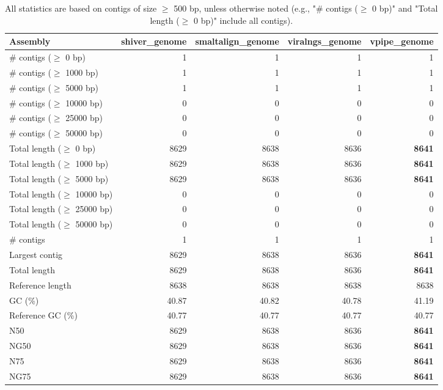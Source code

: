 \documentclass[12pt,a4paper]{article}
\begin{document}
\begin{table}[ht]
\begin{center}
\caption{All statistics are based on contigs of size $\geq$ 500 bp, unless otherwise noted (e.g., "\# contigs ($\geq$ 0 bp)" and "Total length ($\geq$ 0 bp)" include all contigs).}
\begin{tabular}{|l*{4}{|r}|}
\hline
Assembly & shiver\_genome & smaltalign\_genome & viralngs\_genome & vpipe\_genome \\ \hline
\# contigs ($\geq$ 0 bp) & 1 & 1 & 1 & 1 \\ \hline
\# contigs ($\geq$ 1000 bp) & 1 & 1 & 1 & 1 \\ \hline
\# contigs ($\geq$ 5000 bp) & 1 & 1 & 1 & 1 \\ \hline
\# contigs ($\geq$ 10000 bp) & 0 & 0 & 0 & 0 \\ \hline
\# contigs ($\geq$ 25000 bp) & 0 & 0 & 0 & 0 \\ \hline
\# contigs ($\geq$ 50000 bp) & 0 & 0 & 0 & 0 \\ \hline
Total length ($\geq$ 0 bp) & 8629 & 8638 & 8636 & {\bf 8641} \\ \hline
Total length ($\geq$ 1000 bp) & 8629 & 8638 & 8636 & {\bf 8641} \\ \hline
Total length ($\geq$ 5000 bp) & 8629 & 8638 & 8636 & {\bf 8641} \\ \hline
Total length ($\geq$ 10000 bp) & 0 & 0 & 0 & 0 \\ \hline
Total length ($\geq$ 25000 bp) & 0 & 0 & 0 & 0 \\ \hline
Total length ($\geq$ 50000 bp) & 0 & 0 & 0 & 0 \\ \hline
\# contigs & 1 & 1 & 1 & 1 \\ \hline
Largest contig & 8629 & 8638 & 8636 & {\bf 8641} \\ \hline
Total length & 8629 & 8638 & 8636 & {\bf 8641} \\ \hline
Reference length & 8638 & 8638 & 8638 & 8638 \\ \hline
GC (\%) & 40.87 & 40.82 & 40.78 & 41.19 \\ \hline
Reference GC (\%) & 40.77 & 40.77 & 40.77 & 40.77 \\ \hline
N50 & 8629 & 8638 & 8636 & {\bf 8641} \\ \hline
NG50 & 8629 & 8638 & 8636 & {\bf 8641} \\ \hline
N75 & 8629 & 8638 & 8636 & {\bf 8641} \\ \hline
NG75 & 8629 & 8638 & 8636 & {\bf 8641} \\ \hline

\end{tabular}
\end{center}
\end{table}
\end{document}
